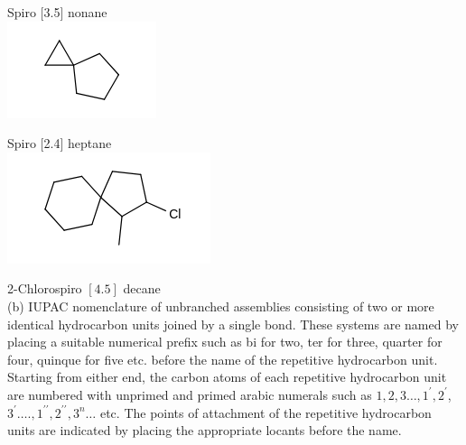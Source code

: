 \documentclass[10pt]{article}
\begin{document}
Spiro [3.5] nonane\\
\includegraphics{smile-c6de86d86da79eeebee279931129e6b03fe29cba}

Spiro [2.4] heptane\\
\includegraphics{smile-2c77d9dddf938389c237bf0d5c03ddb8ba8cfd51}

2-Chlorospiro $[4.5]$ decane\\
(b) IUPAC nomenclature of unbranched assemblies consisting of two or more identical hydrocarbon units joined by a single bond. These systems are named by placing a suitable numerical prefix such as bi for two, ter for three, quarter for four, quinque for five etc. before the name of the repetitive hydrocarbon unit. Starting from either end, the carbon atoms of each repetitive hydrocarbon unit are numbered with unprimed and primed arabic numerals such as $1,2,3 \ldots, 1^{\prime}, 2^{\prime}$, $3^{\prime} \ldots ., 1^{\prime \prime}, 2^{\prime \prime}, 3^{n} \ldots$ etc. The points of attachment of the repetitive hydrocarbon units are indicated by placing the appropriate locants before the name.
\end{document}
